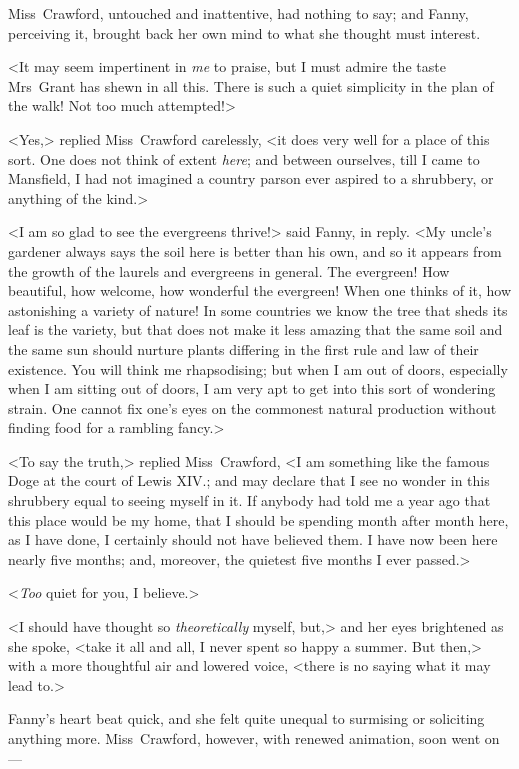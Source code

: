 Miss~Crawford, untouched and inattentive, had nothing to say; and Fanny, perceiving it, brought back her own mind to what she thought must interest.

<It may seem impertinent in \textit{me}  to praise, but I must admire the taste Mrs~Grant has shewn in all this. There is such a quiet simplicity in the plan of the walk! Not too much attempted!>

<Yes,> replied Miss~Crawford carelessly, <it does very well for a place of this sort. One does not think of extent \textit{here}; and between ourselves, till I came to Mansfield, I had not imagined a country parson ever aspired to a shrubbery, or anything of the kind.>

<I am so glad to see the evergreens thrive!> said Fanny, in reply. <My uncle's gardener always says the soil here is better than his own, and so it appears from the growth of the laurels and evergreens in general. The evergreen! How beautiful, how welcome, how wonderful the evergreen! When one thinks of it, how astonishing a variety of nature! In some countries we know the tree that sheds its leaf is the variety, but that does not make it less amazing that the same soil and the same sun should nurture plants differing in the first rule and law of their existence. You will think me rhapsodising; but when I am out of doors, especially when I am sitting out of doors, I am very apt to get into this sort of wondering strain. One cannot fix one's eyes on the commonest natural production without finding food for a rambling fancy.>

<To say the truth,> replied Miss~Crawford, <I am something like the famous Doge at the court of Lewis XIV.; and may declare that I see no wonder in this shrubbery equal to seeing myself in it. If anybody had told me a year ago that this place would be my home, that I should be spending month after month here, as I have done, I certainly should not have believed them. I have now been here nearly five months; and, moreover, the quietest five months I ever passed.>

<\textit{Too}  quiet for you, I believe.>

<I should have thought so \textit{theoretically}  myself, but,> and her eyes brightened as she spoke, <take it all and all, I never spent so happy a summer. But then,> with a more thoughtful air and lowered voice, <there is no saying what it may lead to.>

Fanny's heart beat quick, and she felt quite unequal to surmising or soliciting anything more. Miss~Crawford, however, with renewed animation, soon went on—

